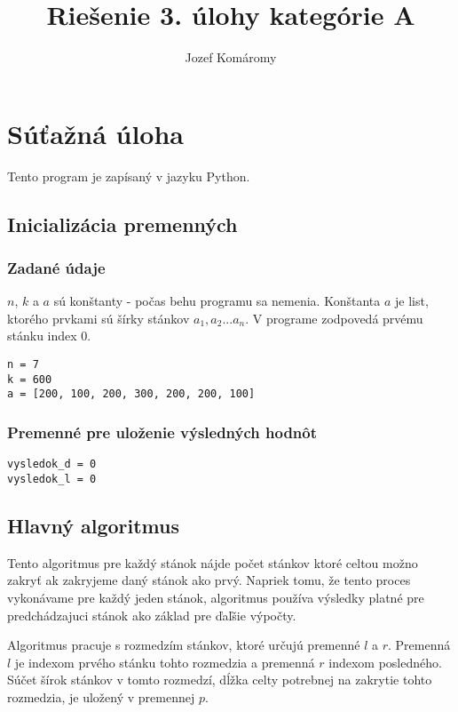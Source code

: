 \documentclass{article}
\begin{document}
\title{Riešenie 3. úlohy kategórie A}
\author{Jozef Komáromy}

\maketitle

\section{Súťažná úloha}

Tento program je zapísaný v jazyku Python.

\subsection{Inicializácia premenných}

\subsubsection*{Zadané údaje}
$n$, $k$ a $a$ sú konštanty - počas behu programu sa nemenia. Konštanta $a$ je list, ktorého prvkami sú šírky stánkov $a_{1}, a_{2} ... a_{n}$. V programe zodpovedá prvému stánku index $0$.
\begin{verbatim}
n = 7
k = 600
a = [200, 100, 200, 300, 200, 200, 100]
\end{verbatim}
\subsubsection*{Premenné pre uloženie výsledných hodnôt}
\begin{verbatim}
vysledok_d = 0
vysledok_l = 0
\end{verbatim}

\subsection{Hlavný algoritmus}

Tento algoritmus pre každý stánok nájde počet stánkov ktoré celtou možno zakryť ak zakryjeme daný stánok ako prvý. Napriek tomu, že tento proces vykonávame pre každý jeden stánok, algoritmus používa výsledky platné pre predchádzajuci stánok ako základ pre ďaľšie výpočty.

Algoritmus pracuje s rozmedzím stánkov, ktoré určujú premenné $l$ a $r$. Premenná $l$ je indexom prvého stánku tohto rozmedzia a premenná $r$ indexom posledného. Súčet šírok stánkov v tomto rozmedzí, dĺžka celty potrebnej na zakrytie tohto rozmedzia, je uložený v premennej $p$.
\end{document}
